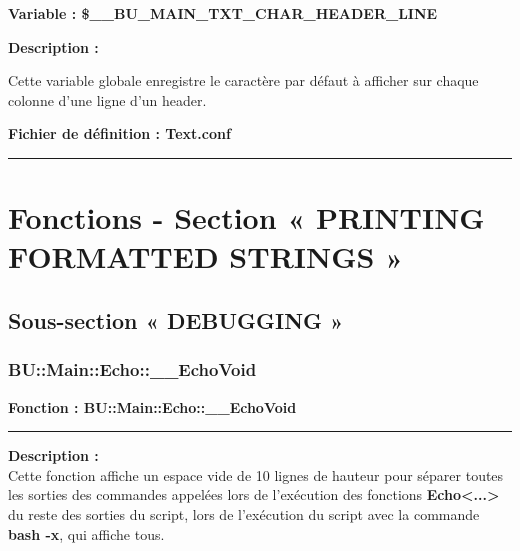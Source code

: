 \documentclass[a4paper,10pt]{article}
\begin{document}
\textbf{Variable : \color{vars}\$\_\_BU\_MAIN\_TXT\_CHAR\_HEADER\_LINE}\\[1\baselineskip]

\setlength{\parskip}{2em}

\begin{justify}
    \textbf{Description :}
\end{justify}

\setlength{\parskip}{1em}

\begin{justify}
    Cette variable globale enregistre le caractère par défaut à afficher sur chaque colonne d'une ligne d'un header.
\end{justify}

\textbf{Fichier de définition : \color{path}Text.conf}\\[1\baselineskip]





\color{sec1}\par\noindent\rule{\textwidth}{0.4pt}\color{text}

\color{sec1}
\section{Fonctions - Section « PRINTING FORMATTED STRINGS »}\color{text}

\color{sec2}
\subsection{Sous-section « DEBUGGING »}\color{text}

\color{sec3}
\subsubsection{BU::Main::Echo::\_\_EchoVoid}\color{text}

\textbf{Fonction : \color{func}BU::Main::Echo::\_\_EchoVoid}\setlength{\parskip}{1em}


\par\noindent\rule{\textwidth}{0.4pt}

\begin{justify}
    \textbf{Description :}\\[1\baselineskip]
    Cette fonction affiche un espace vide de 10 lignes de hauteur pour séparer toutes les sorties des commandes appelées lors de l'exécution des fonctions \textbf{\color{func}Echo<...>} du reste des sorties du script, lors de l'exécution du script avec la commande \textbf{\color{cmds}bash -x}, qui affiche tous.
\end{justify}
\end{document}
